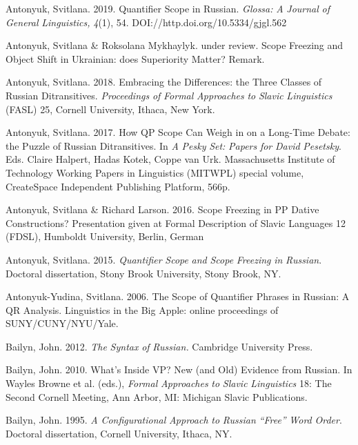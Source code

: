 \documentclass[output=paper,modfonts, nonflat]{langsci/langscibook}
\begin{document}
Antonyuk, Svitlana. 2019. Quantifier Scope in Russian. \textit{Glossa:} \textit{A} \textit{Journal} \textit{of} \textit{General} \textit{Linguistics,} \textit{4}(1), 54. DOI://http.doi.org/10.5334/gjgl.562

Antonyuk, Svitlana \& Roksolana Mykhaylyk. under review. Scope Freezing and Object Shift in Ukrainian: does Superiority Matter? Remark.

Antonyuk, Svitlana. 2018. Embracing the Differences: the Three Classes of Russian Ditransitives. \textit{Proceedings} \textit{of} \textit{Formal} \textit{Approaches} \textit{to} \textit{Slavic} \textit{Linguistics} (FASL) 25, Cornell University, Ithaca, New York.

Antonyuk, Svitlana. 2017. How QP Scope Can Weigh in on a Long-Time Debate: the Puzzle of Russian Ditransitives. In \textit{A} \textit{Pesky} \textit{Set:} \textit{Papers} \textit{for} \textit{David} \textit{Pesetsky}. Eds. Claire Halpert, Hadas Kotek, Coppe van Urk. Massachusetts Institute of Technology Working Papers in Linguistics (MITWPL) special volume, CreateSpace Independent Publishing Platform, 566p.

Antonyuk, Svitlana \& Richard Larson. 2016. Scope Freezing in PP Dative Constructions? Presentation given at Formal Description of Slavic Languages 12 (FDSL), Humboldt University, Berlin, German

Antonyuk, Svitlana. 2015. \textit{Quantifier} \textit{Scope} \textit{and} \textit{Scope} \textit{Freezing} \textit{in} \textit{Russian}. Doctoral dissertation, Stony Brook University, Stony Brook, NY.

Antonyuk-Yudina, Svitlana. 2006. The Scope of Quantifier Phrases in Russian: A QR Analysis. Linguistics in the Big Apple: online proceedings of SUNY/CUNY/NYU/Yale.

Bailyn, John. 2012. \textit{The} \textit{Syntax} \textit{of} \textit{Russian.} Cambridge University Press.

\begin{styleNormalWeb}
Bailyn, John. 2010. What’s Inside VP? New (and Old) Evidence from Russian. In Wayles Browne et al. (eds.), \textit{Formal} \textit{Approaches} \textit{to} \textit{Slavic} \textit{Linguistics} 18: The Second Cornell Meeting, Ann Arbor, MI: Michigan Slavic Publications. 
\end{styleNormalWeb}

Bailyn, John. 1995. \textit{A} \textit{Configurational} \textit{Approach} \textit{to} \textit{Russian} \textit{“Free”} \textit{Word} \textit{Order}. Doctoral dissertation, Cornell University, Ithaca, NY.
\end{document}
